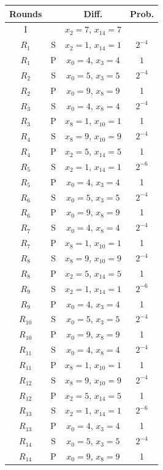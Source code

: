\documentclass[preprint]{transcrypto}
\begin{document}
\begin{enumerate}
\begin{figure}[h!]
        \centering
        \begin{tabular}{ |c||c|c|c| }
            \hline
             Rounds & & Diff. & Prob. \\ \hline \hline
             I& & $x_2 = 7$, $x_{14} = 7$ &  \\ 
             $R_1$& S & $x_2 = 1$, $x_{14} = 1$ & $2^{-4}$ \\
             $R_1$& P & $x_0 = 4$, $x_{3} = 4$ & $1$ \\
             $R_2$& S & $x_0 = 5$, $x_{3} = 5$ & $2^{-4}$ \\
             $R_2$& P & $x_0 = 9$, $x_{8} = 9$ & 1 \\
             $R_3$& S & $x_0 = 4$, $x_{8} = 4$ & $2^{-4}$ \\
             $R_3$& P & $x_8 = 1$, $x_{10} = 1$ & 1 \\
             $R_4$& S & $x_8 = 9$, $x_{10} = 9$ & $2^{-4}$ \\
             $R_4$& P & $x_2 = 5$, $x_{14} = 5$ & 1 \\
             $R_5$& S & $x_2 = 1$, $x_{14} = 1$  & $2^{-6}$ \\
             $R_5$& P & $x_0 = 4$, $x_3 = 4$ & 1 \\
             $R_6$& S & $x_0 = 5$, $x_3 = 5$  & $2^{-4}$ \\
             $R_6$& P & $x_0 = 9$, $x_8 = 9$ & 1 \\
             $R_7$& S & $x_0 = 4$, $x_8 = 4$  & $2^{-4}$ \\
             $R_7$& P & $x_8 = 1$, $x_{10} = 1$ & 1 \\
             $R_8$& S & $x_8 = 9$, $x_{10} = 9$  & $2^{-4}$ \\
             $R_8$& P & $x_2 = 5$, $x_{14} = 5$ & 1 \\
             $R_9$& S & $x_2 = 1$, $x_{14} = 1$  & $2^{-6}$ \\
             $R_9$& P & $x_0 = 4$, $x_3 = 4$ & 1 \\
             $R_{10}$& S & $x_0 = 5$, $x_3 = 5$  & $2^{-4}$ \\
             $R_{10}$& P & $x_0 = 9$, $x_8 = 9$ & 1 \\
             $R_{11}$& S & $x_0 = 4$, $x_{8} = 4$  & $2^{-4}$ \\
             $R_{11}$& P & $x_8 = 1$, $x_10 = 1$ & 1 \\
             $R_{12}$& S & $x_8 = 9$, $x_{10} = 9$  & $2^{-4}$ \\
             $R_{12}$& P & $x_2 = 5$, $x_{14} = 5$ & 1 \\
             $R_{13}$& S & $x_2 = 1$, $x_{14} = 1$  & $2^{-6}$ \\
             $R_{13}$& P & $x_0 = 4$, $x_3 = 4$ & 1 \\
             $R_{14}$& S & $x_0 = 5$, $x_{3} = 5$  & $2^{-4}$ \\
             $R_{14}$& P & $x_0 = 9$, $x_8 = 9$ & 1 \\ \hline
        \end{tabular}
        \label{table7}
    \end{figure}
\end{enumerate}
\end{document}
